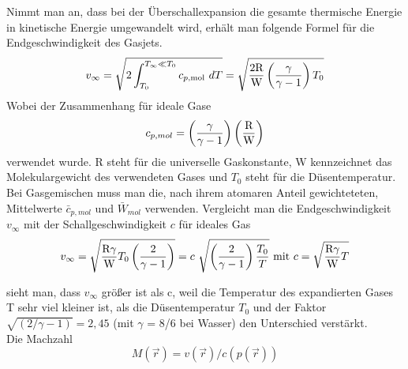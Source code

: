 Nimmt man an, dass bei der Überschallexpansion die gesamte thermische Energie in kinetische Energie umgewandelt wird, erhält man folgende Formel für die Endgeschwindigkeit des Gasjets.
\begin{equation}
v_\infty=\sqrt{2\int_{T_0}^{T_\infty \ll T_0} c_{p,{\tiny \textmd{mol}}}\ dT}= \sqrt{\frac{2\textmd{R}}{\textmd{W}}\left(\frac{\gamma}{\gamma-1}\right)T_0}
\end{equation}
%
Wobei der Zusammenhang für ideale Gase
\begin{equation}
c_{p,mol}= \left(\frac{\gamma}{\gamma-1}\right)\left(\frac{\textmd{R}}{\textmd{W}}\right)
\end{equation}
%
verwendet wurde. R steht für die universelle Gaskonstante, W kennzeichnet das Molekulargewicht des verwendeten Gases und $T_0$ steht für die Düsentemperatur.
Bei Gasgemischen muss man die, nach ihrem atomaren Anteil gewichteteten, Mittelwerte $\bar{c}_{p,mol}$ und $\bar{W}_{mol}$ verwenden.
Vergleicht man die Endgeschwindigkeit $v_{\infty}$ mit der Schallgeschwindigkeit $c$ für ideales Gas
\begin{equation}
v_\infty= \sqrt{\frac{\textmd{R}\gamma}{\textmd{W}}T_0\left(\frac{2}{\gamma-1}\right)} = c\ \sqrt{\left(\frac{2}{\gamma-1}\right)\frac{T_0}{T}} \textmd{ mit } c=\sqrt{\frac{\textmd{R} \gamma}{\textmd{W}}T}
\end{equation}

sieht man, dass $v_{\infty}$ größer ist als c, weil die Temperatur des expandierten Gases T sehr viel kleiner ist, als die Düsentemperatur $T_0$ und der Faktor $\sqrt{(2/\gamma -1)}=2,45$ (mit $\gamma$ = 8/6 bei Wasser) den Unterschied verstärkt.\\
Die Machzahl 
\begin{equation}
M(\vec{r})= v(\vec{r})/c(p(\vec{r}))
\end{equation}

